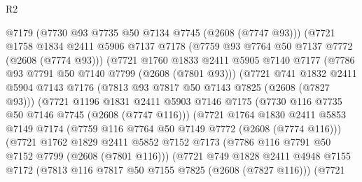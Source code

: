 \begin{lexlean}{R2}
\begin{coremodule}
                        @7179
                        (@7730 @93 @7735 @50 @7134 @7745 (@2608 (@7747 @93)))
                        (@7721
                          @1758
                          @1834
                          @2411
                          @5906
                          @7137
                          @7178
                          (@7759 @93 @7764 @50 @7137 @7772 (@2608 (@7774 @93)))
                          (@7721
                            @1760
                            @1833
                            @2411
                            @5905
                            @7140
                            @7177
                            (@7786 @93 @7791 @50 @7140 @7799 (@2608 (@7801 @93)))
                            (@7721
                              @741
                              @1832
                              @2411
                              @5904
                              @7143
                              @7176
                              (@7813 @93 @7817 @50 @7143 @7825 (@2608 (@7827 @93)))
                              (@7721
                                @1196
                                @1831
                                @2411
                                @5903
                                @7146
                                @7175
                                (@7730 @116 @7735 @50 @7146 @7745 (@2608 (@7747 @116)))
                                (@7721
                                  @1764
                                  @1830
                                  @2411
                                  @5853
                                  @7149
                                  @7174
                                  (@7759 @116 @7764 @50 @7149 @7772 (@2608 (@7774 @116)))
                                  (@7721
                                    @1762
                                    @1829
                                    @2411
                                    @5852
                                    @7152
                                    @7173
                                    (@7786 @116 @7791 @50 @7152 @7799 (@2608 (@7801 @116)))
                                    (@7721
                                      @749
                                      @1828
                                      @2411
                                      @4948
                                      @7155
                                      @7172
                                      (@7813 @116 @7817 @50 @7155 @7825 (@2608 (@7827 @116)))
                                      (@7721

\end{coremodule}
\end{lexlean}
